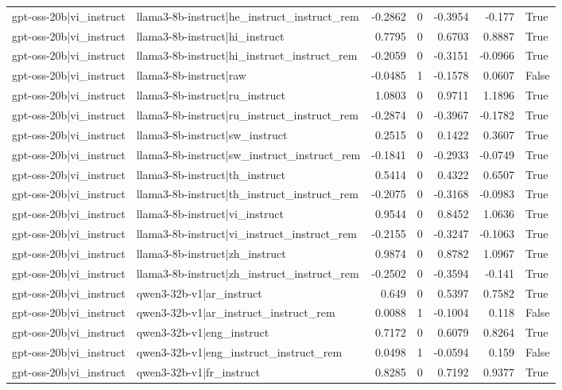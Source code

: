 \begin{table}
\begin{tabular}{l l r r r r l}
gpt-oss-20b|vi_instruct & llama3-8b-instruct|he_instruct_instruct_rem & -0.2862 & 0 & -0.3954 & -0.177 & True \\
gpt-oss-20b|vi_instruct & llama3-8b-instruct|hi_instruct & 0.7795 & 0 & 0.6703 & 0.8887 & True \\
gpt-oss-20b|vi_instruct & llama3-8b-instruct|hi_instruct_instruct_rem & -0.2059 & 0 & -0.3151 & -0.0966 & True \\
gpt-oss-20b|vi_instruct & llama3-8b-instruct|raw & -0.0485 & 1 & -0.1578 & 0.0607 & False \\
gpt-oss-20b|vi_instruct & llama3-8b-instruct|ru_instruct & 1.0803 & 0 & 0.9711 & 1.1896 & True \\
gpt-oss-20b|vi_instruct & llama3-8b-instruct|ru_instruct_instruct_rem & -0.2874 & 0 & -0.3967 & -0.1782 & True \\
gpt-oss-20b|vi_instruct & llama3-8b-instruct|sw_instruct & 0.2515 & 0 & 0.1422 & 0.3607 & True \\
gpt-oss-20b|vi_instruct & llama3-8b-instruct|sw_instruct_instruct_rem & -0.1841 & 0 & -0.2933 & -0.0749 & True \\
gpt-oss-20b|vi_instruct & llama3-8b-instruct|th_instruct & 0.5414 & 0 & 0.4322 & 0.6507 & True \\
gpt-oss-20b|vi_instruct & llama3-8b-instruct|th_instruct_instruct_rem & -0.2075 & 0 & -0.3168 & -0.0983 & True \\
gpt-oss-20b|vi_instruct & llama3-8b-instruct|vi_instruct & 0.9544 & 0 & 0.8452 & 1.0636 & True \\
gpt-oss-20b|vi_instruct & llama3-8b-instruct|vi_instruct_instruct_rem & -0.2155 & 0 & -0.3247 & -0.1063 & True \\
gpt-oss-20b|vi_instruct & llama3-8b-instruct|zh_instruct & 0.9874 & 0 & 0.8782 & 1.0967 & True \\
gpt-oss-20b|vi_instruct & llama3-8b-instruct|zh_instruct_instruct_rem & -0.2502 & 0 & -0.3594 & -0.141 & True \\
gpt-oss-20b|vi_instruct & qwen3-32b-v1|ar_instruct & 0.649 & 0 & 0.5397 & 0.7582 & True \\
gpt-oss-20b|vi_instruct & qwen3-32b-v1|ar_instruct_instruct_rem & 0.0088 & 1 & -0.1004 & 0.118 & False \\
gpt-oss-20b|vi_instruct & qwen3-32b-v1|eng_instruct & 0.7172 & 0 & 0.6079 & 0.8264 & True \\
gpt-oss-20b|vi_instruct & qwen3-32b-v1|eng_instruct_instruct_rem & 0.0498 & 1 & -0.0594 & 0.159 & False \\
gpt-oss-20b|vi_instruct & qwen3-32b-v1|fr_instruct & 0.8285 & 0 & 0.7192 & 0.9377 & True \\

\end{tabular}
\end{table}
